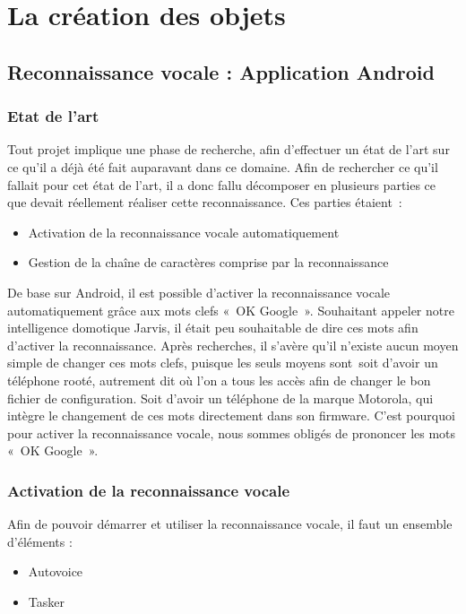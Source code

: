 ﻿\chapter{La création des objets}

\section{Reconnaissance vocale : Application Android}
	\subsection{Etat de l’art}	
Tout projet implique une phase de recherche, afin d'effectuer un état de l'art sur ce qu'il a déjà été fait auparavant dans ce domaine. Afin de rechercher ce qu'il fallait pour cet état de l'art, il a donc fallu décomposer en plusieurs parties ce que devait réellement réaliser cette reconnaissance. Ces parties étaient :

\begin{itemize}
\item Activation de la reconnaissance vocale automatiquement
\item Gestion de la chaîne de caractères comprise par la reconnaissance
\end{itemize}

De base sur Android, il est possible d'activer la reconnaissance vocale  automatiquement grâce aux mots clefs 
« OK Google ». Souhaitant appeler notre intelligence domotique Jarvis, il était peu souhaitable de dire ces mots afin d'activer la reconnaissance.
Après recherches, il s'avère qu'il n'existe aucun moyen simple de changer ces mots clefs, puisque les seuls moyens sont soit d'avoir un téléphone rooté, autrement dit où l'on a tous les accès afin de changer le bon fichier de configuration. Soit d'avoir un téléphone de la marque Motorola, qui intègre le changement de ces mots directement dans son firmware. C'est pourquoi pour activer la reconnaissance vocale, nous sommes obligés de prononcer les mots « OK Google ».
	
	\subsection{Activation de la reconnaissance vocale}
	
Afin de pouvoir démarrer et utiliser la reconnaissance vocale, il faut un ensemble d'éléments :
\begin{itemize}
 \item Autovoice
 \item Tasker
\end{itemize}


